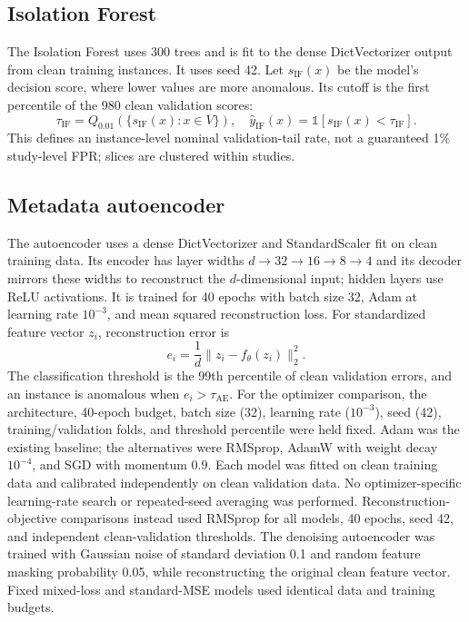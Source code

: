 \documentclass[journal]{IEEEtran}
\begin{document}
  \subsection{Isolation Forest}
  The Isolation Forest uses $300$ trees and is fit to the dense DictVectorizer output from clean training instances. It uses seed 42. Let $s_{\mathrm{IF}}(x)$ be the model's decision score, where lower values are more anomalous. Its cutoff is the first percentile of the 980 clean validation scores:
  \begin{equation}
  \tau_{\mathrm{IF}} = Q_{0.01}\left(\{s_{\mathrm{IF}}(x):x\in V\}\right), \quad
  \hat y_{\mathrm{IF}}(x)=\mathbb{1}[s_{\mathrm{IF}}(x)<\tau_{\mathrm{IF}}].
  \end{equation}
  This defines an instance-level nominal validation-tail rate, not a guaranteed 1\% study-level FPR; slices are clustered within studies.
  
  \subsection{Metadata autoencoder}
  The autoencoder uses a dense DictVectorizer and StandardScaler fit on clean training data. Its encoder has layer widths $d\rightarrow32\rightarrow16\rightarrow8\rightarrow4$ and its decoder mirrors these widths to reconstruct the $d$-dimensional input; hidden layers use ReLU activations. It is trained for 40 epochs with batch size 32, Adam at learning rate $10^{-3}$, and mean squared reconstruction loss. For standardized feature vector $z_i$, reconstruction error is
  \begin{equation}
  e_i = \frac{1}{d}\lVert z_i - f_{\theta}(z_i)\rVert_2^2.
  \end{equation}
  The classification threshold is the 99th percentile of clean validation errors, and an instance is anomalous when $e_i>\tau_{\mathrm{AE}}$. For the optimizer comparison, the architecture, 40-epoch budget, batch size (32), learning rate ($10^{-3}$), seed (42), training/validation folds, and threshold percentile were held fixed. Adam was the existing baseline; the alternatives were RMSprop, AdamW with weight decay $10^{-4}$, and SGD with momentum $0.9$. Each model was fitted on clean training data and calibrated independently on clean validation data. No optimizer-specific learning-rate search or repeated-seed averaging was performed.
  Reconstruction-objective comparisons instead used RMSprop for all models, 40 epochs, seed 42, and independent clean-validation thresholds. The denoising autoencoder was trained with Gaussian noise of standard deviation 0.1 and random feature masking probability 0.05, while reconstructing the original clean feature vector. Fixed mixed-loss and standard-MSE models used identical data and training budgets.
  
\end{document}
